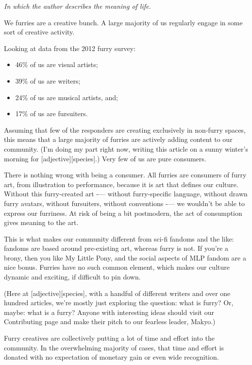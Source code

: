 
\textit{In which the author describes the meaning of life.}

We furries are a creative bunch. A large majority of us regularly engage in some sort of creative activity.

Looking at data from the 2012 furry survey:

\begin{itemize}
  \item 46\% of us are visual artists;
  \item 39\% of us are writers;
  \item 24\% of us are musical artists, and;
  \item 17\% of us are fursuiters.
\end{itemize}

Assuming that few of the responders are creating exclusively in non-furry spaces, this means that a large majority of furries are actively adding content to our community. (I'm doing my part right now, writing this article on a sunny winter's morning for [adjective][species].) Very few of us are pure consumers.

There is nothing wrong with being a consumer. All furries are consumers of furry art, from illustration to performance, because it is art that defines our culture. Without this furry-created art -— without furry-specific language, without drawn furry avatars, without fursuiters, without conventions -— we wouldn't be able to express our furriness. At risk of being a bit postmodern, the act of consumption gives meaning to the art.

This is what makes our community different from sci-fi fandoms and the like: fandoms are based around pre-existing art, whereas furry is not. If you're a brony, then you like My Little Pony, and the social aspects of MLP fandom are a nice bonus. Furries have no such common element, which makes our culture dynamic and exciting, if difficult to pin down.

(Here at [adjective][species], with a handful of different writers and over one hundred articles, we're mostly just exploring the question: what is furry? Or, maybe: what is a furry? Anyone with interesting ideas should visit our Contributing page and make their pitch to our fearless leader, Makyo.)

Furry creatives are collectively putting a lot of time and effort into the community. In the overwhelming majority of cases, that time and effort is donated with no expectation of monetary gain or even wide recognition.

